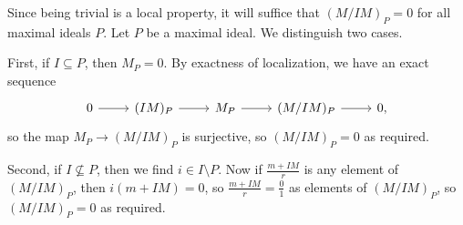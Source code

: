 Since being trivial is a local property, it will suffice that
$(M/IM)_P = 0$ for all maximal ideals $P$. Let $P$ be a maximal ideal.
We distinguish two cases.

First, if $I \subseteq P$, then $M_P = 0$. By exactness of localization, we
have an exact sequence
\[\begin{tikzcd}
	0\ar[r] & (IM)_P\ar[r] & M_P\ar[r] & (M/IM)_P\ar[r] & 0,
\end{tikzcd}\]
so  the map  $M_P \to (M/IM)_P$ is surjective, so $(M/IM)_P = 0$ as required.

Second, if $I\nsubseteq P$, then we find $i \in I\setminus P$. Now if
$\frac{m + IM}{r}$ is any element of $(M/IM)_P$, then
$i(m + IM) = 0$, so  $\frac{m + IM}{r} =\frac{0}{1}$ as elements of $(M/IM)_P$,
so $(M/IM)_P = 0$ as required.
